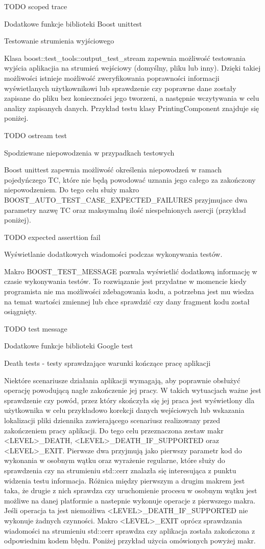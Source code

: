 TODO scoped trace

Dodatkowe funkcje biblioteki Boost unittest

Testowanie strumienia wyjściowego

Klasa boost::test_tools::output_test_stream zapewnia możliwość testowania wyjścia aplikacjia na strumień wejściowy (domyślny, pliku lub inny). Dzięki takiej możliwości istnieje możliwość zweryfikowania poprawności informacji wyświetlanych użytkownikowi lub sprawdzenie czy poprawne dane zostały zapisane do pliku bez konieczności jego tworzeni, a następnie wczytywania w celu analizy zapisanych danych.
Przykład testu klasy PrintingComponent znajduje się poniżej.

TODO ostream test

Spodziewane niepowodzenia w przypadkach testowych

Boost unittest zapewnia możliwość określenia niepowodzeń w ramach pojedyńczego TC, które nie będą powodować uznania jego całego za zakończony niepowodzeniem. Do tego celu służy makro BOOST_AUTO_TEST_CASE_EXPECTED_FAILURES przyjmujace dwa parametry nazwę TC oraz maksymalną ilość niespełnionych asercji (przykład poniżej).

TODO expected asserttion fail

Wyświetlanie dodatkowych wiadomości podczas wykonywania testów.

Makro BOOST_TEST_MESSAGE pozwala wyświetlić dodatkową informację w czasie wykonywania testów. To rozwiązanie jest przydatne w momencie kiedy programista nie ma możliwości zdebagowania kodu, a potrzebna jest mu wiedza na temat wartości zmiennej lub chce sprawdzić czy dany fragment kodu został osiągnięty.

TODO test message

Dodatkowe funkcje biblioteki Google test

Death tests - testy sprawdzające warunki kończące pracę aplikacji

Niektóre scenariusze działania aplikacji wymagają, aby poprawnie obsłużyć operację powodującą nagłe zakończenie jej pracy. W takich wytuacjach ważne jest sprawdzenie czy powód, przez który skończyła się jej praca jest wyświetlony dla użytkownika w celu przykładowo korekcji danych wejściowych lub wskazania lokalizacji pliki dziennika zawierającego scenariusz realizowany przed zakończeniem pracy aplikacji.
Do tego celu przeznaczona zestaw makr <LEVEL>_DEATH, <LEVEL>_DEATH_IF_SUPPORTED oraz <LEVEL>_EXIT. 
Pierwsze dwa przyjmują jako pierwszy parametr kod do wykonania w osobnym wątku oraz wyrażenie regularne, które służy do sprawdzenia czy na strumieniu std::cerr znalazła się interesująca z punktu widzenia testu informacja. Różnica między pierwszym a drugim makrem jest taka, że drugie z nich sprawdza czy uruchomienie procesu w osobnym wątku jest możliwe na danej platformie a nastepnie wykonuje operacje z pierwszego makra. Jeśli operacja ta jest niemożliwa <LEVEL>_DEATH_IF_SUPPORTED nie wykonuje żadnych czynności.
Makro <LEVEL>_EXIT oprócz sprawdzania wiadomości na strumieniu std::cerr sprawdza czy aplikacja została zakończona z odpowiednim kodem błędu.
Poniżej przykład użycia omówionych powyżej makr.

